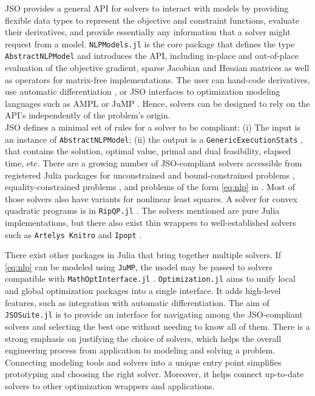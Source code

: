 \documentclass{juliacon}
\begin{document}
JSO provides a general API for solvers to interact with models by providing flexible data types to represent the objective and constraint functions, evaluate their derivatives, and provide essentially any information that a solver might request from a model.
%
\texttt{NLPModels.jl} \cite{orban-siqueira-nlpmodels-2020} is the core package that defines the type \texttt{AbstractNLPModel} and introduces the API, including in-place and out-of-place evaluation of the objective gradient, sparse Jacobian and Hessian matrices as well as operators for matrix-free implementations.
%
The user can hand-code derivatives, use automatic differentiation \cite{orban-siqueira-nlpmodels-2021}, or JSO interfaces to optimization modeling languages such as AMPL \cite{fourer2003ampl} or JuMP \cite{jump}.
%
Hence, solvers can be designed to rely on the API's independently of the problem's origin. 
\\
JSO defines a minimal set of rules for a solver to be compliant:
(i) The input is an instance of \texttt{AbstractNLPModel};
(ii) the output is a \texttt{GenericExecutionStats}  \cite{orban-siqueira-solvercore-2021}, that contains the solution, optimal value, primal and dual feasibility, elapsed time, etc.
%
There are a growing number of JSO-compliant solvers accessible from registered Julia packages for unconstrained and bound-constrained problems \cite{Dussault_AdaptiveRegularization_jl_A_unified,orban-siqueira-jsosolvers-2021}, equality-constrained problems \cite{migot2022dcisolver,Migot_FletcherPenaltySolver_jl_2022,Orban_A_regularization_method_2020}, and problems of the form \eqref{eq:nlp} in \cite{percival-jl,shin2023accelerating}.
Most of those solvers also have variants for nonlinear least squares.
A solver for convex quadratic programs is in \texttt{RipQP.jl} \cite{orban-leconte-ripqp-2020}.
The solvers mentioned are pure Julia implementations, but there also exist thin wrappers to well-established solvers such as \texttt{Artelys Knitro} \cite{byrd2006k} and \texttt{Ipopt} \cite{wachter2006implementation}.

There exist other packages in Julia that bring together multiple solvers.
%
If \eqref{eq:nlp} can be modeled using \texttt{JuMP}, the model may be passed to solvers compatible with \texttt{MathOptInterface.jl} \cite{legat2021mathoptinterface}.
%
\texttt{Optimization.jl} aims to unify local and global optimization packages into a single interface. It adds high-level features, such as integration with automatic differentiation.
%
The aim of \texttt{JSOSuite.jl} is to provide an interface for navigating among the JSO-compliant solvers and selecting the best one without needing to know all of them.
%
There is a strong emphasis on justifying the choice of solvers, which helps the overall engineering process from application to modeling and solving a problem.
%
Connecting modeling tools and solvers into a unique entry point simplifies prototyping and choosing the right solver. Moreover, it helps connect up-to-date solvers to other optimization wrappers and applications.
\end{document}
